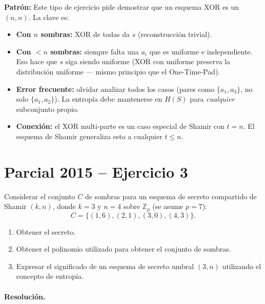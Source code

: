 \documentclass[11pt,a4paper]{article}
\begin{document}
\begin{tipsbox}
\textbf{Patrón:} Este tipo de ejercicio pide demostrar que un esquema XOR es un $(n,n)$. La clave es:
\begin{itemize}
  \item \textbf{Con $n$ sombras:} XOR de todas da $s$ (reconstrucción trivial).
  \item \textbf{Con $<n$ sombras:} siempre falta una $a_i$ que es uniforme e independiente. Eso hace que $s$ siga siendo uniforme (XOR con uniforme preserva la distribución uniforme — mismo principio que el One-Time-Pad).
  \item \textbf{Error frecuente:} olvidar analizar todos los casos (pares como $\{a_1,a_3\}$, no solo $\{a_1,a_2\}$). La entropía debe mantenerse en $H(S)$ para \emph{cualquier} subconjunto propio.
  \item \textbf{Conexión:} el XOR multi-parte es un caso especial de Shamir con $t=n$. El esquema de Shamir generaliza esto a cualquier $t \le n$.
\end{itemize}
\end{tipsbox}

\section{Parcial 2015 -- Ejercicio 3}
\label{sec:2015}

\begin{consignabox}
Considerar el conjunto $C$ de sombras para un esquema de secreto compartido de Shamir $(k,n)$, donde $k=3$ y $n=4$ sobre $\mathbb{Z}_p$ (se asume $p=7$):
\[
  C = \{(1,6),(2,1),(3,0),(4,3)\}.
\]
\begin{enumerate}
  \item Obtener el secreto.
  \item Obtener el polinomio utilizado para obtener el conjunto de sombras.
  \item Expresar el significado de un esquema de secreto umbral $(3,n)$ utilizando el concepto de entropía.
\end{enumerate}
\end{consignabox}

\paragraph{Resolución.}
\end{document}
